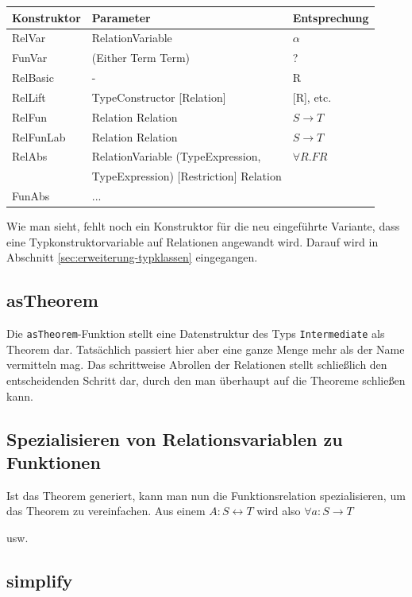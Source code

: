 \documentclass[11pt]{article} %
\begin{document}

\begin{tabular}{| l | l | l |}
\hline
Konstruktor & Parameter & Entsprechung \\
\hline
RelVar & RelationVariable & $\alpha$ \\
FunVar & (Either Term Term) & ? \\
RelBasic & - & R \\
RelLift & TypeConstructor [Relation] & [R], etc. \\
RelFun & Relation Relation & $S \rightarrow T$ \\
RelFunLab & Relation Relation & $S \rightarrow T$ \\
RelAbs & RelationVariable (TypeExpression,  & $\forall R . F R$ \\
& TypeExpression) [Restriction] Relation & \\
FunAbs & ... & \\
\hline
\end{tabular}

Wie man sieht, fehlt noch ein Konstruktor für die neu eingeführte Variante, dass eine Typkonstruktorvariable auf Relationen
angewandt wird. Darauf wird in Abschnitt \ref{sec:erweiterung-typklassen} eingegangen.

\subsection{asTheorem}

Die \texttt{asTheorem}-Funktion stellt eine Datenstruktur des Typs \texttt{Intermediate} als Theorem dar. Tatsächlich passiert hier aber eine ganze Menge mehr als der Name
vermitteln mag. Das schrittweise Abrollen der Relationen stellt schließlich den entscheidenden Schritt dar, durch den man überhaupt auf
die Theoreme schließen kann.


\subsection{Spezialisieren von Relationsvariablen zu Funktionen}

Ist das Theorem generiert, kann man nun die Funktionsrelation spezialisieren, um das Theorem zu vereinfachen. Aus einem
$A : S \leftrightarrow T$ wird also $\forall a : S \rightarrow T$

usw.

\subsection{simplify}
\end{document}

